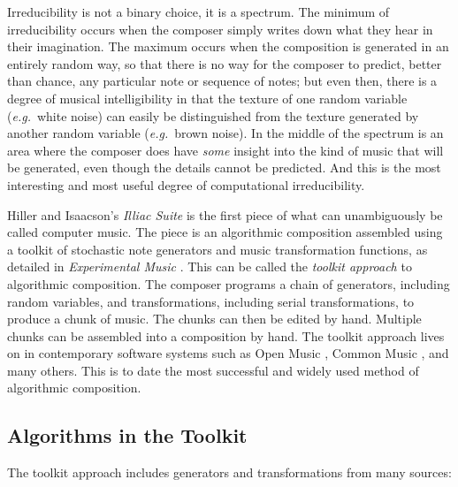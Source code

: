 \documentclass[11pt,papersize=a4]{scrartcl}
\begin{document}
Irreducibility is not a binary choice, it is a spectrum. The minimum of irreducibility occurs when the composer simply writes down what they hear in their imagination. The maximum occurs when the composition is generated in an entirely random way, so that there is no way for the composer to predict, better than chance, any particular note or sequence of notes; but even then, there is a degree of musical intelligibility in that the texture of one random variable (\emph{e.g.}\ white noise) can easily be distinguished from the texture generated by another random variable (\emph{e.g.}\ brown noise). In the middle of the spectrum is an area where the composer does have \emph{some} insight into the kind of music that will be generated, even though the details cannot be predicted. And this is the most interesting and most useful degree of computational irreducibility. 

Hiller and Isaacson's \emph{Illiac Suite} \parencite{illiacsuite} is the first piece of what can unambiguously be called computer music. The piece is an algorithmic composition assembled using a toolkit of stochastic note generators and music transformation functions, as detailed in \emph{Experimental Music} \parencite{hiller}. This can be called the \emph{toolkit approach} to algorithmic composition. The composer programs a chain of generators, including random variables, and transformations, including serial transformations, to produce a chunk of music. The chunks can then be edited by hand. Multiple chunks can be assembled into a composition by hand. The toolkit approach lives on in contemporary software systems such as Open Music \parencite{OpenMusic}, Common Music \parencite{CommonMusic, musx}, and many others. This is to date the most successful and widely used method of algorithmic composition. 

\subsection*{Algorithms in the Toolkit}

The toolkit approach includes generators and transformations from many sources:
\end{document}
